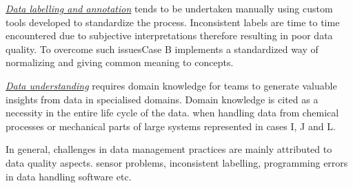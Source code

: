 % 


\underline{\emph{Data labelling and annotation}} tends to be undertaken manually using custom tools developed to standardize the process. %
Inconsistent labels are time to time encountered due to subjective interpretations therefore resulting in poor data quality. To overcome such issues\DIFaddbegin \DIFadd{, }\DIFaddend Case B implements a standardized way of normalizing and giving common meaning to concepts. %

\underline{\emph{Data understanding}} requires domain knowledge for teams to generate valuable insights from data in specialised domains. Domain knowledge is cited as a necessity in the entire life cycle of the data. \DIFdelbegin {}\DIFdelend \DIFaddbegin {}\DIFaddend when handling data from chemical processes or mechanical parts of large systems represented in cases I, J and L. %

In general, challenges in data management practices are mainly attributed to data quality aspects. \DIFdelbegin {}\DIFdelend \DIFaddbegin {}\DIFaddend sensor problems, inconsistent labelling, programming errors in data handling software etc.



